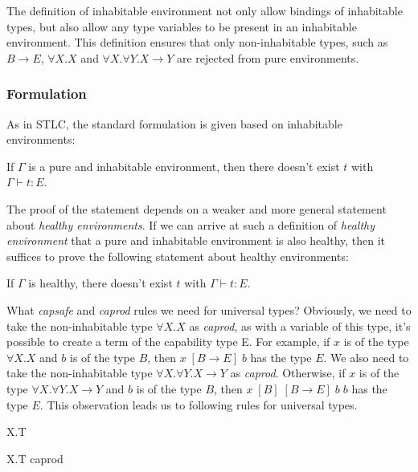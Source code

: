 The definition of inhabitable environment not only allow bindings of
inhabitable types, but also allow any type variables to be present in
an inhabitable environment. This definition ensures that only
non-inhabitable types, such as $B \to E$, $\forall X.X$ and
$\forall X.\forall Y.X \to Y$ are rejected from pure environments.

\subsubsection{Formulation}

As in STLC, the standard formulation is given based on inhabitable
environments:

\begin{definition}
  If $\Gamma$ is a pure and inhabitable environment, then there
  doesn't exist $t$ with $\Gamma \vdash t : E$.
\end{definition}

The proof of the statement depends on a weaker and more general
statement about \emph{healthy environments}. If we can arrive at such
a definition of \emph{healthy environment} that a pure and inhabitable
environment is also healthy, then it suffices to prove the following
statement about healthy environments:

\begin{definition}
  If $\Gamma$ is healthy, there doesn't exist $t$ with
  $\Gamma \vdash t : E$.
\end{definition}

What \emph{capsafe} and \emph{caprod} rules we need for universal
types? Obviously, we need to take the non-inhabitable type
$\forall X.X$ as \emph{caprod}, as with a variable of this type, it's
possible to create a term of the capability type E. For example, if
$x$ is of the type $\forall X.X$ and $b$ is of the type $B$, then
$x \; [B \to E] \; b$ has the type $E$.  We also need to take the
non-inhabitable type $\forall X. \forall Y. X \to Y$ as
\emph{caprod}. Otherwise, if $x$ is of the type
$\forall X. \forall Y. X \to Y$ and $b$ is of the type $B$, then
$x \; [B] \; [B \to E] \; b \; b$ has the type $E$. This observation
leads us to following rules for universal types.

{ \forall X.T \quad {} }

{ \forall X.T \quad caprod }

